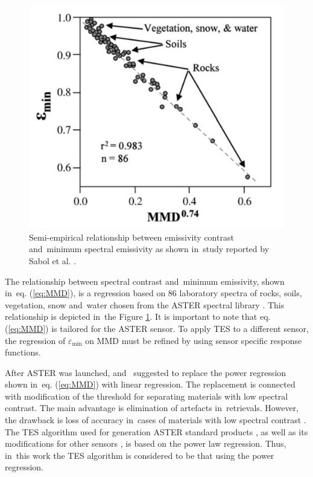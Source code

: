 \begin{figure}[!t]
	\centering
	\includegraphics[scale=0.2]{pics/Chapter_03/EpsMinMMD.png}
	\vspace{1.5 em}
	\caption{Semi-empirical relationship between emissivity contrast and~minimum spectral emissivity as shown in~study reported by Sabol et al. \cite{SG09}.}
	\label{fig:EpsMinMMD}
\end{figure}

The relationship between spectral contrast and~minimum emissivity, shown in~eq. (\ref{eq:MMD}), is a regression based on 86 laboratory spectra of rocks, soils, vegetation, snow and~water chosen from the ASTER spectral library \cite{BH09}. This relationship is depicted in~the Figure \ref{fig:EpsMinMMD}. It is important to note that eq. (\ref{eq:MMD}) is tailored for the ASTER sensor. To apply  {TES to a} different sensor,  {the} regression of $\varepsilon_\mathrm{min}$ on MMD  {must be} refined by using sensor specific response functions. 

After ASTER was launched, \cite{GG06} and~\cite{SG09} suggested to replace the power regression shown in~eq. (\ref{eq:MMD}) with linear regression. The replacement is connected with modification of the threshold for separating materials with low spectral contrast. The main advantage is elimination of artefacts in~retrievals. However, the drawback is loss of accuracy in~cases of materials with low spectral contrast \cite{SG09}. The TES algorithm used for generation ASTER standard products \cite{B15}, as well as its modifications for other sensors \cite{SJ06, JS12, WX11, SJ02, JS14, HH11, MB02, HH11-2}, is based on the power law regression. Thus, in~this work the TES algorithm is considered to be that using the power regression.

